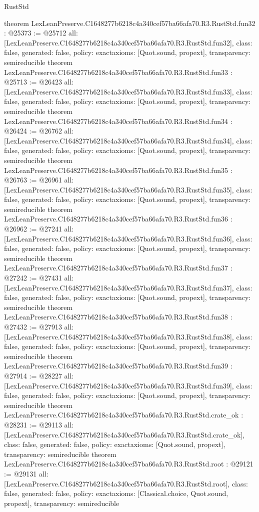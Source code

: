 \begin{lexlean}{RustStd}
\begin{coremodule}
{}
theorem LexLeanPreserve.C1648277b6218c4a340cef57ba66afa70.R3.RustStd.fun32 : @25373 := @25712 {
  all: [LexLeanPreserve.C1648277b6218c4a340cef57ba66afa70.R3.RustStd.fun32],
  class: false,
  generated: false,
  policy: exact{axioms: [Quot.sound, propext]},
  transparency: semireducible
}
theorem LexLeanPreserve.C1648277b6218c4a340cef57ba66afa70.R3.RustStd.fun33 : @25713 := @26423 {
  all: [LexLeanPreserve.C1648277b6218c4a340cef57ba66afa70.R3.RustStd.fun33],
  class: false,
  generated: false,
  policy: exact{axioms: [Quot.sound, propext]},
  transparency: semireducible
}
theorem LexLeanPreserve.C1648277b6218c4a340cef57ba66afa70.R3.RustStd.fun34 : @26424 := @26762 {
  all: [LexLeanPreserve.C1648277b6218c4a340cef57ba66afa70.R3.RustStd.fun34],
  class: false,
  generated: false,
  policy: exact{axioms: [Quot.sound, propext]},
  transparency: semireducible
}
theorem LexLeanPreserve.C1648277b6218c4a340cef57ba66afa70.R3.RustStd.fun35 : @26763 := @26961 {
  all: [LexLeanPreserve.C1648277b6218c4a340cef57ba66afa70.R3.RustStd.fun35],
  class: false,
  generated: false,
  policy: exact{axioms: [Quot.sound, propext]},
  transparency: semireducible
}
theorem LexLeanPreserve.C1648277b6218c4a340cef57ba66afa70.R3.RustStd.fun36 : @26962 := @27241 {
  all: [LexLeanPreserve.C1648277b6218c4a340cef57ba66afa70.R3.RustStd.fun36],
  class: false,
  generated: false,
  policy: exact{axioms: [Quot.sound, propext]},
  transparency: semireducible
}
theorem LexLeanPreserve.C1648277b6218c4a340cef57ba66afa70.R3.RustStd.fun37 : @27242 := @27431 {
  all: [LexLeanPreserve.C1648277b6218c4a340cef57ba66afa70.R3.RustStd.fun37],
  class: false,
  generated: false,
  policy: exact{axioms: [Quot.sound, propext]},
  transparency: semireducible
}
theorem LexLeanPreserve.C1648277b6218c4a340cef57ba66afa70.R3.RustStd.fun38 : @27432 := @27913 {
  all: [LexLeanPreserve.C1648277b6218c4a340cef57ba66afa70.R3.RustStd.fun38],
  class: false,
  generated: false,
  policy: exact{axioms: [Quot.sound, propext]},
  transparency: semireducible
}
theorem LexLeanPreserve.C1648277b6218c4a340cef57ba66afa70.R3.RustStd.fun39 : @27914 := @28227 {
  all: [LexLeanPreserve.C1648277b6218c4a340cef57ba66afa70.R3.RustStd.fun39],
  class: false,
  generated: false,
  policy: exact{axioms: [Quot.sound, propext]},
  transparency: semireducible
}
theorem LexLeanPreserve.C1648277b6218c4a340cef57ba66afa70.R3.RustStd.crate_ok : @28231 := @29113 {
  all: [LexLeanPreserve.C1648277b6218c4a340cef57ba66afa70.R3.RustStd.crate_ok],
  class: false,
  generated: false,
  policy: exact{axioms: [Quot.sound, propext]},
  transparency: semireducible
}
theorem LexLeanPreserve.C1648277b6218c4a340cef57ba66afa70.R3.RustStd.root : @29121 := @29131 {
  all: [LexLeanPreserve.C1648277b6218c4a340cef57ba66afa70.R3.RustStd.root],
  class: false,
  generated: false,
  policy: exact{axioms: [Classical.choice, Quot.sound, propext]},
  transparency: semireducible
}


\end{coremodule}
\end{lexlean}
